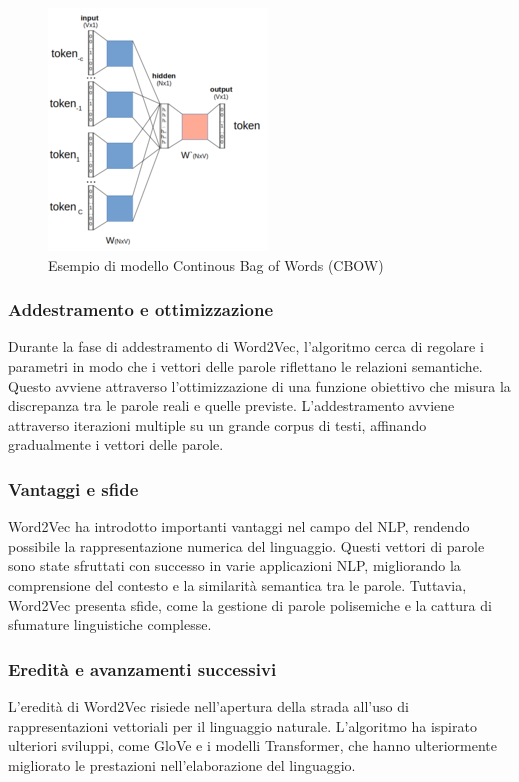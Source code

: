 \begin{center}
    \begin{figure}[H]
        \centering
        \includegraphics{images/CBOW.png}
        \caption{Esempio di modello Continous Bag of Words (CBOW)}
        \label{fig:cbow}
    \end{figure}
\end{center}

\subsubsection{Addestramento e ottimizzazione}
Durante la fase di addestramento di Word2Vec, l'algoritmo cerca di regolare i parametri in modo che i vettori delle parole riflettano le relazioni semantiche. Questo avviene attraverso l'ottimizzazione di una funzione obiettivo che misura la discrepanza tra le parole reali e quelle previste. L'addestramento avviene attraverso iterazioni multiple su un grande corpus di testi, affinando gradualmente i vettori delle parole.

\subsubsection{Vantaggi e sfide}
Word2Vec ha introdotto importanti vantaggi nel campo del NLP, rendendo possibile la rappresentazione numerica del linguaggio. Questi vettori di parole sono state sfruttati con successo in varie applicazioni NLP, migliorando la comprensione del contesto e la similarità semantica tra le parole. Tuttavia, Word2Vec presenta sfide, come la gestione di parole polisemiche e la cattura di sfumature linguistiche complesse.

\subsubsection{Eredità e avanzamenti successivi}
L'eredità di Word2Vec risiede nell'apertura della strada all'uso di rappresentazioni vettoriali per il linguaggio naturale. L'algoritmo ha ispirato ulteriori sviluppi, come GloVe e i modelli Transformer, che hanno ulteriormente migliorato le prestazioni nell'elaborazione del linguaggio.
